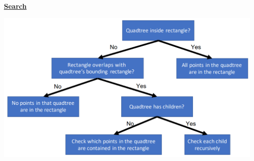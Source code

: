     {\centering\underline{\textbf{Search}}\par}
        \includegraphics[width = \linewidth]{src/4_data_structure/images/quadtree_rectangle.png}
        
    